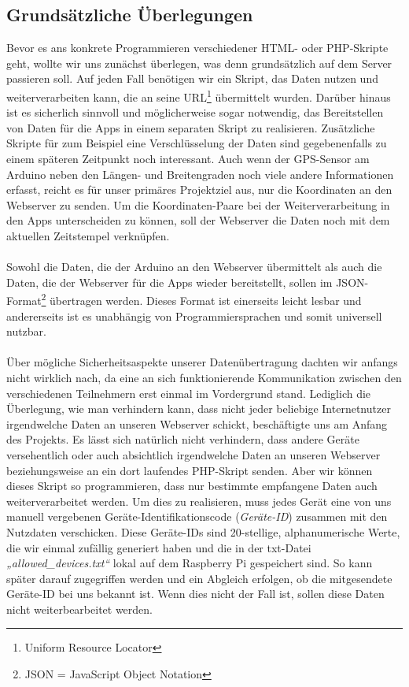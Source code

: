 \subsection{Grundsätzliche Überlegungen}
Bevor es ans konkrete Programmieren verschiedener HTML- oder PHP-Skripte geht, wollte wir uns zunächst überlegen, was denn grundsätzlich auf dem Server passieren soll. Auf jeden Fall benötigen wir ein Skript, das Daten nutzen und weiterverarbeiten kann, die an seine URL\footnote{Uniform Resource Locator} übermittelt wurden. Darüber hinaus ist es sicherlich sinnvoll und möglicherweise sogar notwendig, das Bereitstellen von Daten für die Apps in einem separaten Skript zu realisieren. Zusätzliche Skripte für zum Beispiel eine Verschlüsselung der Daten sind gegebenenfalls zu einem späteren Zeitpunkt noch interessant.
Auch wenn der GPS-Sensor am Arduino neben den Längen- und Breitengraden noch viele andere Informationen erfasst, reicht es für unser primäres Projektziel aus, nur die Koordinaten an den Webserver zu senden. Um die Koordinaten-Paare bei der Weiterverarbeitung in den Apps unterscheiden zu können, soll der Webserver die Daten noch mit dem aktuellen Zeitstempel verknüpfen.
\\
\\
Sowohl die Daten, die der Arduino an den Webserver übermittelt als auch die Daten, die der Webserver für die Apps wieder bereitstellt, sollen im JSON-Format\footnote{JSON = JavaScript Object Notation} übertragen werden. Dieses Format ist einerseits leicht lesbar und andererseits ist es unabhängig von Programmiersprachen und somit universell nutzbar.
\\
\\
Über mögliche Sicherheitsaspekte unserer Datenübertragung dachten wir anfangs nicht wirklich nach, da eine an sich funktionierende Kommunikation zwischen den verschiedenen Teilnehmern erst einmal im Vordergrund stand. Lediglich die Überlegung, wie man verhindern kann, dass nicht jeder beliebige Internetnutzer irgendwelche Daten an unseren Webserver schickt, beschäftigte uns am Anfang des Projekts. Es lässt sich natürlich nicht verhindern, dass andere Geräte versehentlich oder auch absichtlich irgendwelche Daten an unseren Webserver beziehungsweise an ein dort laufendes PHP-Skript senden. Aber wir können dieses Skript so programmieren, dass nur bestimmte empfangene Daten auch weiterverarbeitet werden. Um dies zu realisieren, muss jedes Gerät eine von uns manuell vergebenen Geräte-Identifikationscode (\textit{Geräte-ID}) zusammen mit den Nutzdaten verschicken. Diese Geräte-IDs sind 20-stellige, alphanumerische Werte, die wir einmal zufällig generiert haben und die in der txt-Datei \textit{„allowed\_devices.txt“} lokal auf dem Raspberry Pi gespeichert sind. So kann später darauf zugegriffen werden und ein Abgleich erfolgen, ob die mitgesendete Geräte-ID bei uns bekannt ist. Wenn dies nicht der Fall ist, sollen diese Daten nicht weiterbearbeitet werden.
